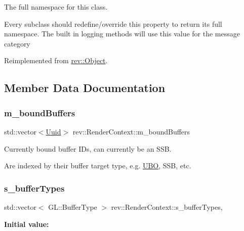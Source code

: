 The full namespace for this class. 

Every subclass should redefine/override this property to return its full namespace. The built in logging methods will use this value for the message category 

Reimplemented from \mbox{\hyperlink{classrev_1_1_object_aaeb638d3e10f361c56c211a318a27f3d}{rev\+::\+Object}}.



\subsection{Member Data Documentation}
\mbox{\label{classrev_1_1_render_context_aff265253ee2e10e55fabb1124945ff0d}} 
\subsubsection{\texorpdfstring{m\_boundBuffers}{m\_boundBuffers}}
{\footnotesize\ttfamily std\+::vector$<$\mbox{\hyperlink{classrev_1_1_uuid}{Uuid}}$>$ rev\+::\+Render\+Context\+::m\+\_\+bound\+Buffers\hspace{0.3cm}{\ttfamily [protected]}}



Currently bound buffer I\+Ds, can currently be an S\+SB. 

Are indexed by their buffer target type, e.\+g. \mbox{\hyperlink{classrev_1_1_u_b_o}{U\+BO}}, S\+SB, etc. \mbox{\label{classrev_1_1_render_context_a160e6d33ab3e3adf518931355dd638aa}} 
\subsubsection{\texorpdfstring{s\_bufferTypes}{s\_bufferTypes}}
{\footnotesize\ttfamily std\+::vector$<$ G\+L\+::\+Buffer\+Type $>$ rev\+::\+Render\+Context\+::s\+\_\+buffer\+Types\hspace{0.3cm}{\ttfamily [static]}, {\ttfamily [protected]}}

{\bfseries Initial value\+:}
\begin{DoxyCode}{0}
\DoxyCodeLine{= \{}
\DoxyCodeLine{\}}

\end{DoxyCode}



